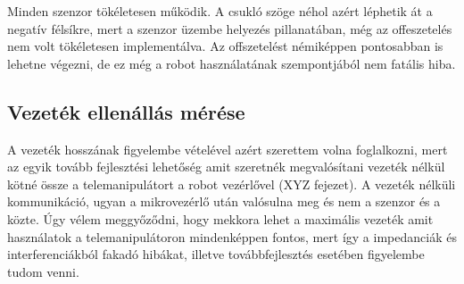Minden szenzor tökéletesen működik. A csukló szöge néhol azért léphetik át a negatív félsíkre, mert a szenzor üzembe helyezés pillanatában, még az offeszetelés nem volt tökéletesen implementálva. Az offszetelést némiképpen pontosabban is lehetne végezni, de ez még a robot használatának szempontjából nem fatális hiba.


\subsection{Vezeték ellenállás mérése}

A vezeték hosszának figyelembe vételével azért szerettem volna foglalkozni, mert az egyik tovább fejlesztési lehetőség amit szeretnék megvalósítani vezeték nélkül kötné össze a telemanipulátort a robot vezérlővel (XYZ fejezet). A vezeték nélküli kommunikáció, ugyan a mikrovezérlő után valósulna meg és nem a szenzor és a közte. Úgy vélem meggyőződni, hogy mekkora lehet a maximális vezeték amit használatok a telemanipulátoron mindenképpen fontos, mert így a impedanciák és interferenciákból fakadó hibákat, illetve továbbfejlesztés esetében figyelembe tudom venni.


